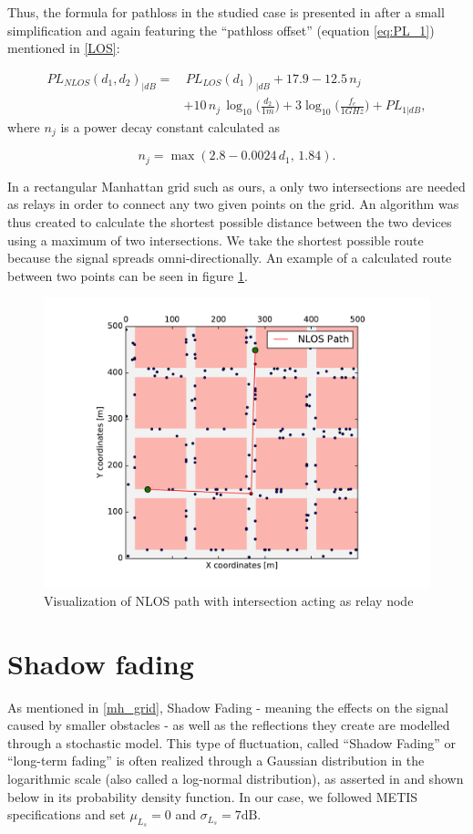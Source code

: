 Thus, the formula for pathloss in the studied case is presented in \cite{Raschkowski} after a small simplification and again featuring the ``pathloss offset'' (equation \ref{eq:PL_1}) mentioned in \ref{LOS}:

\begin{equation} \label{eq:NLOS}
\begin{split}
  PL_{NLOS}(d_1,d_2)_{|dB} = & \,PL_{LOS}(d_1)_{|dB} + 17.9 - 12.5\,n_j \\
  & + 10\,n_j\,\log_{10} \bigg( \frac {d_2} {1 m} \bigg) + 3 \log_{10} \bigg( \frac { f_c } { 1 GHz } \bigg) + PL_{1|dB},
\end{split}
\end{equation}
where $n_j$ is a power decay constant calculated as

\begin{equation} \label{eq:n_j}
n_j = \max (2.8 - 0.0024\,d_1,\,1.84).
\end{equation}

In a rectangular Manhattan grid such as ours, a only two intersections are needed as relays in order to connect any two given points on the grid. An algorithm was thus created to calculate the shortest possible distance between the two devices using a maximum of two intersections. We take the shortest possible route because the signal spreads omni-directionally. An example of a calculated route between two points can be seen in figure \ref{fig:two_points}.

\begin{figure}[H]
\centering
\includegraphics[width=.7\linewidth]{figures/two_points}
\caption{Visualization of NLOS path with intersection acting as relay node}
\label{fig:two_points}
\end{figure}

\section{Shadow fading} \label{SF}
As mentioned in \ref{mh_grid}, Shadow Fading - meaning the effects on the signal caused by smaller obstacles - as well as the reflections they create are modelled through a stochastic model. This type of fluctuation, called ``Shadow Fading'' or ``long-term fading'' is often realized through a Gaussian distribution in the logarithmic scale (also called a log-normal distribution), as asserted in \cite{Forkel2004} and shown below in its probability density function. In our case, we followed METIS specifications and set $\mu_{L_s} = 0$ and $\sigma_{L_s} = 7 \text{dB}$.

